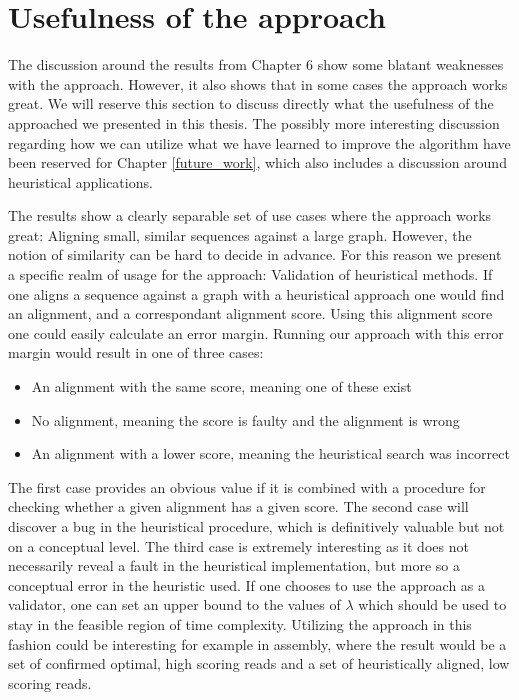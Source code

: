 \documentclass[thesis.tex]{subfiles}
\begin{document}
\section{Usefulness of the approach}
The discussion around the results from Chapter 6 show some blatant weaknesses with the approach. However, it also shows that in some cases the approach works great. We will reserve this section to discuss directly what the usefulness of the approached we presented in this thesis. The possibly more interesting discussion regarding how we can utilize what we have learned to improve the algorithm have been reserved for Chapter \ref{future_work}, which also includes a discussion around heuristical applications.\\
\par\noindent
The results show a clearly separable set of use cases where the approach works great: Aligning small, similar sequences against a large graph. However, the notion of similarity can be hard to decide in advance. For this reason we present a specific realm of usage for the approach: Validation of heuristical methods. If one aligns a sequence against a graph with a heuristical approach one would find an alignment, and a correspondant alignment score. Using this alignment score one could easily calculate an error margin. Running our approach with this error margin would result in one of three cases:
\begin{itemize}
  \item An alignment with the same score, meaning one of these exist
  \item No alignment, meaning the score is faulty and the alignment is wrong
  \item An alignment with a lower score, meaning the heuristical search was incorrect
\end{itemize}
The first case provides an obvious value if it is combined with a procedure for checking whether a given alignment has a given score. The second case will discover a bug in the heuristical procedure, which is definitively valuable but not on a conceptual level. The third case is extremely interesting as it does not necessarily reveal a fault in the heuristical implementation, but more so a conceptual error in the heuristic used. If one chooses to use the approach as a validator, one can set an upper bound to the values of $\lambda$ which should be used to stay in the feasible region of time complexity. Utilizing the approach in this fashion could be interesting for example in assembly, where the result would be a set of confirmed optimal, high scoring reads and a set of heuristically aligned, low scoring reads.
\end{document}
